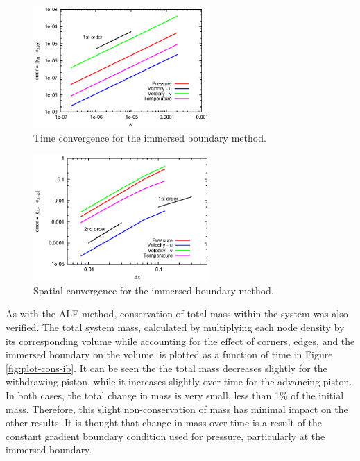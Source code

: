 \documentclass{article}
\begin{document}
\begin{figure}
    \centering
    \includegraphics[width=0.6\textwidth]{timeconvib.eps}         
    \caption{Time convergence for the immersed boundary method.}
    \label{fig:timeconvib}
  \end{figure}
\begin{figure}
    \centering
    \includegraphics[width=0.6\textwidth]{spaceconvib.eps}         
    \caption{Spatial convergence for the immersed boundary method.}
    \label{fig:spaceconvib}
  \end{figure}

As with the ALE method, conservation of total mass within the system was also verified. The total system mass, calculated by multiplying each node density by its corresponding volume while accounting for the effect of corners, edges, and the immersed boundary on the volume, is plotted as a function of time in Figure \ref{fig:plot-cons-ib}. It can be seen the the total mass decreases slightly for the withdrawing piston, while it increases slightly over time for the advancing piston. In both cases, the total change in mass is very small, less than 1\% of the initial mass. Therefore, this slight non-conservation of mass has minimal impact on the other results. It is thought that change in mass over time is a result of the constant gradient boundary condition used for pressure, particularly at the immersed boundary. 
\end{document}
